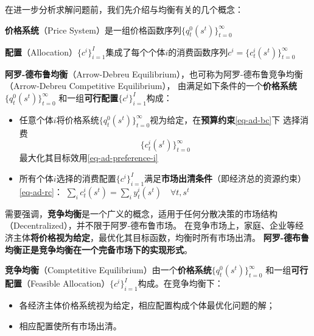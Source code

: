 在进一步分析求解问题前，我们先介绍与均衡有关的几个概念：
\begin{definition}
    \textbf{价格系统}（Price System）是一组价格函数序列$\{q_t^0\left(s^t\right)\}_{t=0}^{\infty}$
        
\end{definition}
\begin{definition}
    \textbf{配置}（Allocation）$\{c^i\}_{i=1}^{I}$集成了每个个体$i$的消费函数序列$c^i=\{c_t^i\left(s^t\right)\}_{t=0}^{\infty}$
\end{definition}

\begin{definition}
    \textbf{阿罗-德布鲁均衡}（Arrow-Debreu Equilibrium），也可称为阿罗-德布鲁竞争均衡（Arrow-Debreu Competitive Equilibrium），
    由满足如下条件的一个\textbf{价格系统}$\{q_t^0\left(s^t\right)\}_{t=0}^{\infty}$
    和一组\textbf{可行配置}$\{c^i\}_{i=1}^{I}$构成：
    \begin{itemize}
        \item 任意个体$i$将价格系统$\{q_t^0\left(s^t\right)\}_{t=0}^{\infty}$视为给定，在\textbf{预算约束}\ref{eq-ad-bc}下
            选择消费$$\{c_t^i\left(s^t\right)\}_{t=0}^{\infty}$$
            最大化其目标效用\ref{eq-ad-preference-i}
        \item 所有个体$i$选择的消费配置$\{c^i\}_{i=1}^{I}$满足\textbf{市场出清条件}（即经济总的资源约束）\ref{eq-ad-rc}：
        $\sum_i c_t^i\left(s^t\right) = \sum_i y_t^i\left(s^t\right) \quad \forall t, s^t$
    \end{itemize}
\end{definition}

需要强调，\textbf{竞争均衡}是一个广义的概念，适用于任何分散决策的市场结构（Decentralized），并不限于阿罗-德布鲁市场。
在竞争市场上，家庭、企业等经济主体\textbf{将价格视为给定}，最优化其目标函数，均衡时所有市场出清。
\textbf{阿罗-德布鲁均衡正是竞争均衡在一个完备市场下的实现形式}。
\begin{definition}
    \textbf{竞争均衡}（Comptetitive Equilibrium）由一个\textbf{价格系统}$\{q_t^0\left(s^t\right)\}_{t=0}^{\infty}$
    和一组\textbf{可行配置}（Feasible Allocation）$\{c^i\}_{i=1}^{I}$构成。在竞争均衡下：
    \begin{itemize}
        \item 各经济主体价格系统视为给定，相应配置构成个体最优化问题的解；
        \item 相应配置使所有市场出清。
    \end{itemize}
\end{definition}


